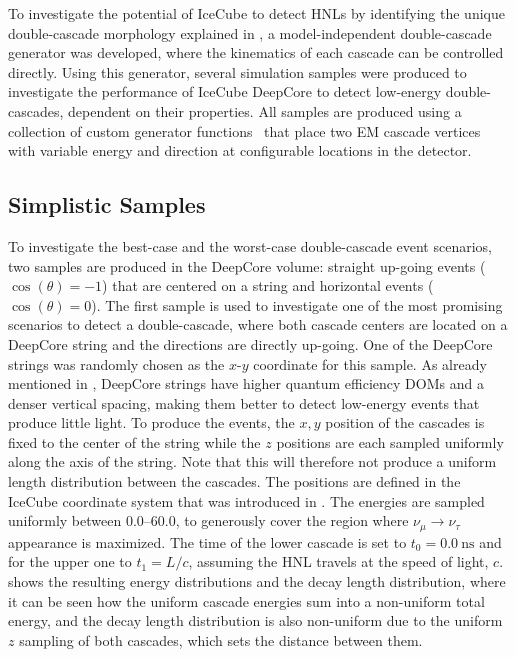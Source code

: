 To investigate the potential of IceCube to detect HNLs by identifying the unique double-cascade morphology explained in , a model-independent double-cascade generator was developed, where the kinematics of each cascade can be controlled directly. Using this generator, several simulation samples were produced to investigate the performance of IceCube DeepCore to detect low-energy double-cascades, dependent on their properties. All samples are produced using a collection of custom generator functions~\cite{cascade_generator_functions} that place two EM cascade vertices with variable energy and direction at configurable locations in the detector.


\subsection{Simplistic Samples} 

To investigate the best-case and the worst-case double-cascade event scenarios, two samples are produced in the DeepCore volume: straight up-going events ($\cos(\theta)=-1$) that are centered on a string and horizontal events ($\cos(\theta)=0$). The first sample is used to investigate one of the most promising scenarios to detect a double-cascade, where both cascade centers are located on a DeepCore string and the directions are directly up-going. One of the DeepCore strings was randomly chosen as the $x$-$y$ coordinate for this sample. As already mentioned in , DeepCore strings have higher quantum efficiency DOMs and a denser vertical spacing, making them better to detect low-energy events that produce little light. To produce the events, the $x,y$ position of the cascades is fixed to the center of the string while the $z$ positions are each sampled uniformly along the axis of the string. Note that this will therefore not produce a uniform length distribution between the cascades. The positions are defined in the IceCube coordinate system that was introduced in . The energies are sampled uniformly between \SIrange[range-phrase={~and~}]{0.0}{60.0}{\gev}, to generously cover the region where $\nu_\mu\rightarrow\nu_\tau$ appearance is maximized. The time of the lower cascade is set to $t_0=\SI{0.0}{\nano\second}$ and for the upper one to $t_1=L/c$, assuming the HNL travels at the speed of light, $c$.  shows the resulting energy distributions and the decay length distribution, where it can be seen how the uniform cascade energies sum into a non-uniform total energy, and the decay length distribution is also non-uniform due to the uniform $z$ sampling of both cascades, which sets the distance between them.

